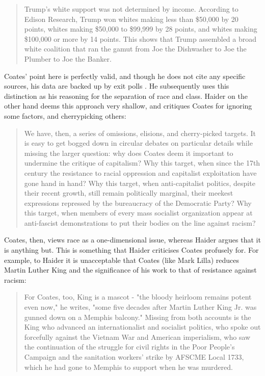 \begin{quote}
Trump's white support was not determined by income. According to Edison Research, Trump won whites making less than \$50,000 by 20 points, whites making \$50,000 to \$99,999 by 28 points, and whites making \$100,000 or more by 14 points. This shows that Trump assembled a broad white coalition that ran the gamut from Joe the Dishwasher to Joe the Plumber to Joe the Banker. \cite{coates}
\end{quote}

Coates' point here is perfectly valid, and though he does not cite any specific sources, his data are backed up by exit polls \cite{exitpolls}. He subsequently uses this distinction as his reasoning for the separation of race and class. Haider on the other hand deems this approach very shallow, and critiques Coates for ignoring some factors, and cherrypicking others:

\begin{quote}
We have, then, a series of omissions, elisions, and cherry-picked targets. It is easy to get bogged down in circular debates on particular details while missing the larger question: why does Coates deem it important to undermine the critique of capitalism? Why this target, when since the 17th century the resistance to racial oppression and capitalist exploitation have gone hand in hand? Why this target, when anti-capitalist politics, despite their recent growth, still remain politically marginal, their meekest expressions repressed by the bureaucracy of the Democratic Party? Why this target, when members of every mass socialist organization appear at anti-fascist demonstrations to put their bodies on the line against racism? \cite{haider}
\end{quote}

Coates, then, views race as a one-dimensional issue, whereas Haider argues that it is anything but. This is something that Haider criticises Coates profusely for. For example, to Haider it is unacceptable that Coates (like Mark Lilla) reduces Martin Luther King and the significance of his work to that of resistance against racism:

\begin{quote}
For Coates, too, King is a mascot - "the bloody heirloom remains potent even now," he writes, "some five decades after Martin Luther King Jr. was gunned down on a Memphis balcony." Missing from both accounts is the King who advanced an internationalist and socialist politics, who spoke out forcefully against the Vietnam War and American imperialism, who saw the continuation of the struggle for civil rights in the Poor People's Campaign and the sanitation workers' strike by AFSCME Local 1733, which he had gone to Memphis to support when he was murdered. \cite{haider}
\end{quote}

